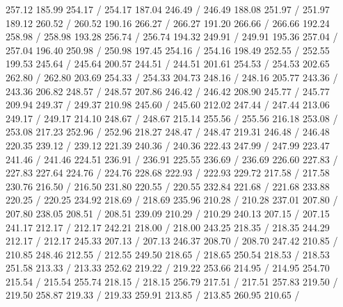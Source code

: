 { 257.12 185.99 254.17 /
 254.17 187.04 246.49 /
 246.49 188.08 251.97 /
 251.97 189.12 260.52 /
 260.52 190.16 266.27 /
 266.27 191.20 266.66 /
 266.66 192.24 258.98 /
 258.98 193.28 256.74 /
 256.74 194.32 249.91 /
 249.91 195.36 257.04 /
 257.04 196.40 250.98 /
 250.98 197.45 254.16 /
 254.16 198.49 252.55 /
 252.55 199.53 245.64 /
 245.64 200.57 244.51 /
 244.51 201.61 254.53 /
 254.53 202.65 262.80 /
 262.80 203.69 254.33 /
 254.33 204.73 248.16 /
 248.16 205.77 243.36 /
 243.36 206.82 248.57 /
 248.57 207.86 246.42 /
 246.42 208.90 245.77 /
 245.77 209.94 249.37 /
 249.37 210.98 245.60 /
 245.60 212.02 247.44 /
 247.44 213.06 249.17 /
 249.17 214.10 248.67 /
 248.67 215.14 255.56 /
 255.56 216.18 253.08 /
 253.08 217.23 252.96 /
 252.96 218.27 248.47 /
 248.47 219.31 246.48 /
 246.48 220.35 239.12 /
 239.12 221.39 240.36 /
 240.36 222.43 247.99 /
 247.99 223.47 241.46 /
 241.46 224.51 236.91 /
 236.91 225.55 236.69 /
 236.69 226.60 227.83 /
 227.83 227.64 224.76 /
 224.76 228.68 222.93 /
 222.93 229.72 217.58 /
 217.58 230.76 216.50 /
 216.50 231.80 220.55 /
 220.55 232.84 221.68 /
 221.68 233.88 220.25 /
 220.25 234.92 218.69 /
 218.69 235.96 210.28 /
 210.28 237.01 207.80 /
 207.80 238.05 208.51 /
 208.51 239.09 210.29 /
 210.29 240.13 207.15 /
 207.15 241.17 212.17 /
 212.17 242.21 218.00 /
 218.00 243.25 218.35 /
 218.35 244.29 212.17 /
 212.17 245.33 207.13 /
 207.13 246.37 208.70 /
 208.70 247.42 210.85 /
 210.85 248.46 212.55 /
 212.55 249.50 218.65 /
 218.65 250.54 218.53 /
 218.53 251.58 213.33 /
 213.33 252.62 219.22 /
 219.22 253.66 214.95 /
 214.95 254.70 215.54 /
 215.54 255.74 218.15 /
 218.15 256.79 217.51 /
 217.51 257.83 219.50 /
 219.50 258.87 219.33 /
 219.33 259.91 213.85 /
 213.85 260.95 210.65 /
}
